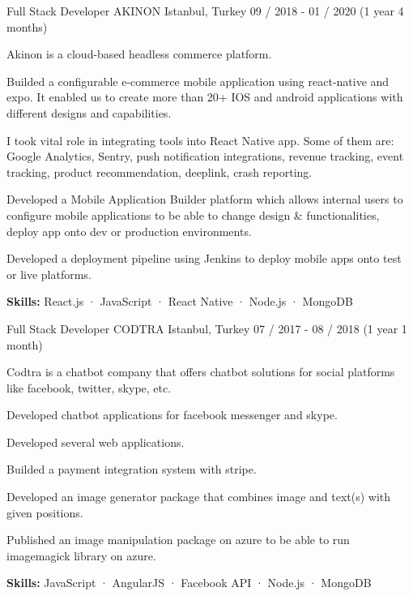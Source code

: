 \begin{cventries}
  \cventry
    {Full Stack Developer} %
    {AKINON} %
    {Istanbul, Turkey} %
    {09 / 2018 - 01 / 2020 (1 year 4 months)}
    {
      \begin{cvitems} %
        \item {Akinon is a cloud-based headless commerce platform.}
        \item {Builded a configurable e-commerce mobile application using react-native and expo. It enabled us to create more than 20+ IOS and android applications with different designs and capabilities.}
        \item {I took vital role in integrating tools into React Native app. Some of them are: Google Analytics, Sentry, push notification integrations, revenue tracking, event tracking, product recommendation, deeplink, crash reporting.}
        \item {Developed a Mobile Application Builder platform which allows internal users to configure mobile applications to be able to change design {\&} functionalities, deploy app onto dev or production environments.}
        \item {Developed a deployment pipeline using Jenkins to deploy mobile apps onto test or live platforms.}
        \item {\textbf {Skills:} React.js · JavaScript · React Native · Node.js · MongoDB}
      \end{cvitems}
    }

  \cventry
    {Full Stack Developer} %
    {CODTRA} %
    {Istanbul, Turkey} %
    {07 / 2017 - 08 / 2018 (1 year 1 month)}
    {
      \begin{cvitems} %
        \item {Codtra is a chatbot company that offers chatbot solutions for social platforms like facebook, twitter, skype, etc.}
        \item {Developed chatbot applications for facebook messenger and skype.}
        \item {Developed several web applications.}
        \item {Builded a payment integration system with stripe.}
        \item {Developed an image generator package that combines image and text(s) with given positions.}
        \item {Published an image manipulation package on azure to be able to run imagemagick library on azure.}
        \item {\textbf {Skills:} JavaScript · AngularJS · Facebook API · Node.js · MongoDB}
      \end{cvitems}
    }


\end{cventries}
